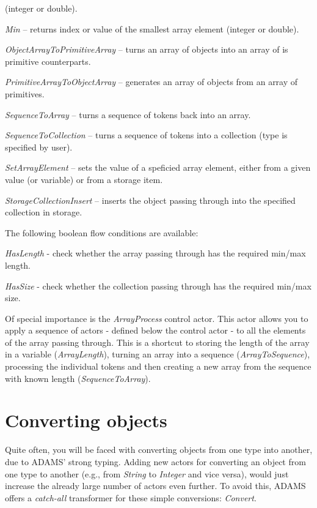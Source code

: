 \begin{tight_itemize}
	(integer or double).
	\item \textit{Min} -- returns index or value of the smallest array element
	(integer or double).
	\item \textit{ObjectArrayToPrimitiveArray} -- turns an array of objects
	into an array of is primitive counterparts.
	\item \textit{PrimitiveArrayToObjectArray} -- generates an array of objects
	from an array of primitives.
	\item \textit{SequenceToArray} -- turns a sequence of tokens back into an
	array.
	\item \textit{SequenceToCollection} -- turns a sequence of tokens into a
	collection (type is specified by user).
	\item \textit{SetArrayElement} -- sets the value of a speficied array 
	element, either from a given value (or variable) or from a storage item.
	\item \textit{StorageCollectionInsert} -- inserts the object passing through
	into the specified collection in storage.
\end{tight_itemize}
The following boolean flow conditions are available:
\begin{tight_itemize}
  \item \textit{HasLength} - check whether the array passing through has the required min/max length.
  \item \textit{HasSize} - check whether the collection passing through has the required min/max size.
\end{tight_itemize}
Of special importance is the \textit{ArrayProcess} control actor. This actor
allows you to apply a sequence of actors - defined below the control actor - to
all the elements of the array passing through. This is a shortcut to storing the
length of the array in a variable (\textit{ArrayLength}), turning an array into
a sequence (\textit{ArrayToSequence}), processing the individual tokens and then
creating a new array from the sequence with known length
(\textit{SequenceToArray}).

\newpage
\section{Converting objects}
\label{converting_objects}
Quite often, you will be faced with converting objects from one type into
another, due to ADAMS' strong typing. Adding new actors for converting an object
from one type to another (e.g., from \textit{String} to \textit{Integer} and 
vice versa), would just increase the already large number of actors even
further. To avoid this, ADAMS offers a \textit{catch-all} transformer for these
simple conversions: \textit{Convert}. 


